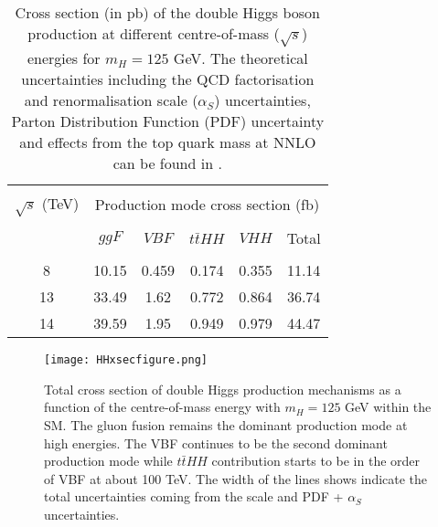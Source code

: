 \begin{table*}[ht]
	{\setlength{\tabcolsep}{14pt}
		\caption[Cross section (in pb) of the Higgs boson pair production at different centre-of-mass ($\sqrt{s}$) energies for $m_H=125$ GeV. The theoretical uncertainties including the QCD factorisation and renormalisation scale ($\alpha_S$) uncertainties, Parton Distribution Function (PDF) uncertainty and effects from the top quark mass at NNLO can be found in the reference.]{Cross section (in pb) of the double Higgs boson production at different centre-of-mass ($\sqrt{s}$) energies for $m_H=125$ GeV. The theoretical uncertainties including the QCD factorisation and renormalisation scale ($\alpha_S$) uncertainties, Parton Distribution Function (PDF) uncertainty and effects from the top quark mass at NNLO can be found in \cite{higgs-br-vs-mH}.}
		\begin{center}
			\vspace{-6mm}
			\begin{tabular}{cccccc}
				\hline \\[-2.45ex] \hline \\[-2.1ex]
				$\sqrt{s}$ (TeV) & \multicolumn{5}{c}{Production mode cross section (fb)} \\
				\hline \\[-1.8ex]
				& $ggF$ & $VBF$ & $t\bar tHH$ & $VHH$ & Total \\
				\hline \\[-1.8ex]
                8 & 10.15 & 0.459 & 0.174 & 0.355 & 11.14 \\
                13 & 33.49 & 1.62 & 0.772 & 0.864 & 36.74 \\
                14 & 39.59 & 1.95 & 0.949 & 0.979 & 44.47 \\
				\hline
			\end{tabular}
			\vspace{-6mm}
		\end{center}
		\label{HHxsecTable}}
\end{table*}

\begin{figure}[ht]
	\centering
	\texttt{[image: HHxsecfigure.png]}
	\vspace{2mm}
	\caption[Total cross section of double Higgs production mechanisms as a function of the centre-of-mass energy with $m_H = 125$ GeV within the SM. The gluon fusion remains the dominant production mode at high energies. The VBF continues to be the second dominant production mode while $t\bar tHH$ contribution starts to be in the order of VBF at about 100 TeV. The width of the lines shows indicate the total uncertainties coming from the scale and PDF + $\alpha_S$ uncertainties.]
	{Total cross section of double Higgs production mechanisms as a function of the centre-of-mass energy with $m_H = 125$ GeV within the SM. The gluon fusion remains the dominant production mode at high energies. The VBF continues to be the second dominant production mode while $t\bar tHH$ contribution starts to be in the order of VBF at about 100 TeV. The width of the lines shows indicate the total uncertainties coming from the scale and PDF + $\alpha_S$ uncertainties\cite{DiMicco:2690841}.}
	\label{HHxsecfigure}
\end{figure}

